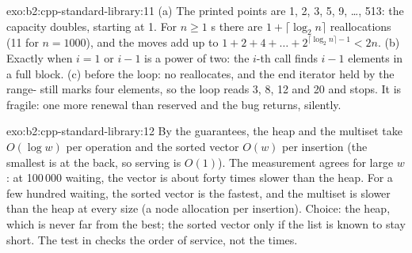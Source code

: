 \begin{solution}{exo:b2:cpp-standard-library:11}
(a) The printed points are 1, 2, 3, 5, 9, \dots, 513: the capacity doubles, starting at 1. For $n \geq 1$
s there are $1 + \lceil \log_2 n \rceil$ reallocations (11 for $n = 1000$), and the moves add up to
$1 + 2 + 4 + \dots + 2^{\lceil \log_2 n \rceil - 1} < 2n$. (b) Exactly when $i = 1$ or $i - 1$ is a power of two: the
$i$-th call finds $i - 1$ elements in a full block. (c)  before the loop: no
 reallocates, and the end iterator held by the range- still marks four elements, so the
loop reads 3, 8, 12 and 20 and stops. It is fragile: one more renewal than reserved and the bug returns, silently.
\end{solution}

\begin{solution}{exo:b2:cpp-standard-library:12}
By the guarantees, the heap and the multiset take $O(\log w)$ per operation and the sorted vector $O(w)$ per
insertion (the smallest is at the back, so serving is $O(1)$). The measurement agrees for large $w$: at 100\,000
waiting, the vector is about forty times slower than the heap. For a few hundred waiting, the sorted vector is the
fastest, and the multiset is slower than the heap at every size (a node allocation per insertion). Choice: the heap,
which is never far from the best; the sorted vector only if the list is known to stay short. The test in
 checks the order of service, not the times.
\end{solution}

